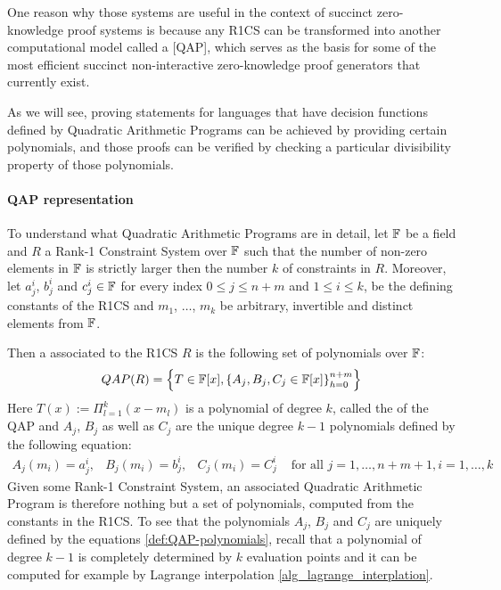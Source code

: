 One reason why those systems are useful in the context of succinct zero-knowledge proof systems is because any R1CS can be transformed into another computational model called a  [QAP], which serves as the basis for some of the most efficient succinct non-interactive zero-knowledge proof generators that currently exist. 

As we will see, proving statements for languages that have decision functions defined by Quadratic Arithmetic Programs can be achieved by providing certain polynomials, and those proofs can be verified by checking a particular divisibility property of those polynomials.
 
\paragraph{QAP representation} To understand what Quadratic Arithmetic Programs are in detail, let $\mathbb{F}$ be a field and $R$ a Rank-1 Constraint System over $\mathbb{F}$ such that the number of non-zero elements in $\mathbb{F}$ is strictly larger then the number $k$ of constraints in $R$. Moreover, let $a_j^i$, $b_j^i$ and $c_j^i\in\mathbb{F}$ for every index $0\leq j \leq n+m$ and $1\leq i \leq k$, be the defining constants of the R1CS and $m_1$, $\ldots$, $m_k$ be arbitrary, invertible and distinct elements from $\mathbb{F}$.
  
Then a  associated to the R1CS $R$ is the following set of polynomials over $\mathbb{F}$:
\begin{equation}
\label{def:QAP-target-poly}
QAP(R) = \left\{T\in \mathbb{F}[x],\left\{A_j,B_j,C_j\in \mathbb{F}[x]\right\}_{h=0}^{n+m}\right\}
\end{equation}
Here $T(x) := \Pi_{l=1}^k (x- m_l)$ is a polynomial of degree $k$, called the  of the QAP and $A_j$, $B_j$ as well as $C_j$ are the unique degree $k-1$ polynomials defined by the following equation:
\begin{equation}
\label{def:QAP-polynomials}
\begin{array}{lllr}
A_j(m_i)=a_j^i, & B_j(m_i)=b_j^i, & C_j(m_i)=C_j^i & \text{ for all } j= 1, \ldots , n+m+1, i=1,\ldots,k 
\end{array}
\end{equation}
Given some Rank-1 Constraint System, an associated Quadratic Arithmetic Program is therefore nothing but a set of polynomials, computed from the constants in the R1CS. To see that the polynomials $A_j$, $B_j$ and $C_j$ are uniquely defined by the equations \ref{def:QAP-polynomials}, recall that a polynomial of degree $k-1$ is completely determined by $k$ evaluation points and it can be computed for example by Lagrange interpolation \ref{alg_lagrange_interplation}.

